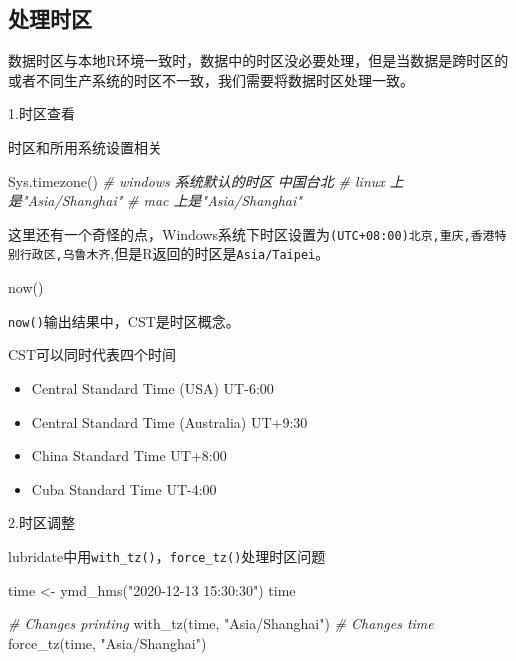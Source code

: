 \documentclass[
]{book}
\newenvironment{Shaded}{\begin{snugshade}}{\end{snugshade}}
\newcommand{\CommentTok}[1]{\textcolor[rgb]{0.56,0.35,0.01}{\textit{#1}}}
\newcommand{\FunctionTok}[1]{\textcolor[rgb]{0.00,0.00,0.00}{#1}}
\newcommand{\NormalTok}[1]{#1}
\newcommand{\OtherTok}[1]{\textcolor[rgb]{0.56,0.35,0.01}{#1}}
\newcommand{\StringTok}[1]{\textcolor[rgb]{0.31,0.60,0.02}{#1}}
\providecommand{\tightlist}{%
  \setlength{\itemsep}{0pt}\setlength{\parskip}{0pt}}
\begin{document}
\hypertarget{time-zones}{%
\subsection{处理时区}\label{time-zones}}

数据时区与本地R环境一致时，数据中的时区没必要处理，但是当数据是跨时区的或者不同生产系统的时区不一致，我们需要将数据时区处理一致。

1.时区查看

时区和所用系统设置相关

\begin{Shaded}
\begin{Highlighting}[]
\FunctionTok{Sys.timezone}\NormalTok{()}
\CommentTok{\# windows 系统默认的时区 中国台北}
\CommentTok{\# linux 上是"Asia/Shanghai"}
\CommentTok{\# mac 上是"Asia/Shanghai"}
\end{Highlighting}
\end{Shaded}

这里还有一个奇怪的点，Windows系统下时区设置为\texttt{(UTC+08:00)北京,重庆,香港特别行政区,乌鲁木齐},但是R返回的时区是\texttt{Asia/Taipei}。

\begin{Shaded}
\begin{Highlighting}[]
\FunctionTok{now}\NormalTok{()}
\end{Highlighting}
\end{Shaded}

\texttt{now()}输出结果中，CST是时区概念。

CST可以同时代表四个时间

\begin{itemize}
\tightlist
\item
  Central Standard Time (USA) UT-6:00
\item
  Central Standard Time (Australia) UT+9:30
\item
  China Standard Time UT+8:00
\item
  Cuba Standard Time UT-4:00
\end{itemize}

2.时区调整

lubridate中用\texttt{with\_tz()}，\texttt{force\_tz()}处理时区问题

\begin{Shaded}
\begin{Highlighting}[]
\NormalTok{time }\OtherTok{\textless{}{-}} \FunctionTok{ymd\_hms}\NormalTok{(}\StringTok{"2020{-}12{-}13 15:30:30"}\NormalTok{)}
\NormalTok{time}

\CommentTok{\# Changes printing}
\FunctionTok{with\_tz}\NormalTok{(time, }\StringTok{"Asia/Shanghai"}\NormalTok{)}
\CommentTok{\# Changes time}
\FunctionTok{force\_tz}\NormalTok{(time, }\StringTok{"Asia/Shanghai"}\NormalTok{)}
\end{Highlighting}
\end{Shaded}
\end{document}
